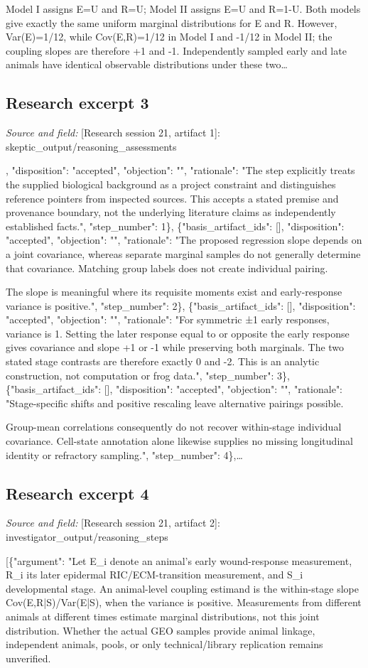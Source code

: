 \documentclass[11pt]{article}
\begin{document}
Model I assigns E=U and R=U; Model II assigns E=U and R=1-U. Both models give exactly the same uniform marginal distributions for E and R. However, Var(E)=1/12, while Cov(E,R)=1/12 in Model I and -1/12 in Model II; the coupling slopes are therefore +1 and -1. Independently sampled early and late animals have identical observable distributions under these two\ldots{}

\subsection{Research excerpt 3}
\textit{Source and field: }[Research session 21, artifact 1]: skeptic\_output/reasoning\_assessments\par
[\{"basis\_artifact\_ids": [], "disposition": "accepted", "objection": "", "rationale": "The step explicitly treats the supplied biological background as a project constraint and distinguishes reference pointers from inspected sources. This accepts a stated premise and provenance boundary, not the underlying literature claims as independently established facts.", "step\_number": 1\}, \{"basis\_artifact\_ids": [], "disposition": "accepted", "objection": "", "rationale": "The proposed regression slope depends on a joint covariance, whereas separate marginal samples do not generally determine that covariance. Matching group labels does not create individual pairing.

The slope is meaningful where its requisite moments exist and early-response variance is positive.", "step\_number": 2\}, \{"basis\_artifact\_ids": [], "disposition": "accepted", "objection": "", "rationale": "For symmetric ±1 early responses, variance is 1. Setting the later response equal to or opposite the early response gives covariance and slope +1 or -1 while preserving both marginals. The two stated stage contrasts are therefore exactly 0 and -2. This is an analytic construction, not computation or frog data.", "step\_number": 3\}, \{"basis\_artifact\_ids": [], "disposition": "accepted", "objection": "", "rationale": "Stage-specific shifts and positive rescaling leave alternative pairings possible.

Group-mean correlations consequently do not recover within-stage individual covariance. Cell-state annotation alone likewise supplies no missing longitudinal identity or refractory sampling.", "step\_number": 4\},\ldots{}

\subsection{Research excerpt 4}
\textit{Source and field: }[Research session 21, artifact 2]: investigator\_output/reasoning\_steps\par
[\{"argument": "Let E\_i denote an animal's early wound-response measurement, R\_i its later epidermal RIC/ECM-transition measurement, and S\_i developmental stage. An animal-level coupling estimand is the within-stage slope Cov(E,R|S)/Var(E|S), when the variance is positive. Measurements from different animals at different times estimate marginal distributions, not this joint distribution. Whether the actual GEO samples provide animal linkage, independent animals, pools, or only technical/library replication remains unverified.
\end{document}
